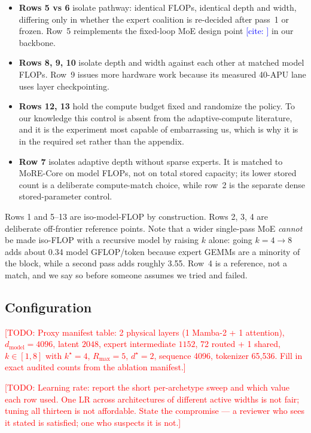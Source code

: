 \documentclass[11pt]{article}
\newcommand{\TODO}[1]{\textcolor{red}{[TODO: #1]}}
\newcommand{\CITE}[1]{\textcolor{blue}{[cite: \detokenize{#1}]}}
\newcommand{\Rmax}{R_{\max}}
\begin{document}
\begin{itemize}
\item \textbf{Rows 5 vs 6} isolate pathway: identical FLOPs, identical depth and
width, differing only in whether the expert coalition is re-decided after pass~1
or frozen. Row~5 reimplements the fixed-loop MoE design point
\CITE{loopmoe2026} in our backbone.
\item \textbf{Rows 8, 9, 10} isolate depth and width against each other at
matched model FLOPs. Row~9 issues more hardware work because its measured
40-APU lane uses layer checkpointing.
\item \textbf{Rows 12, 13} hold the compute budget fixed and randomize the
policy. To our knowledge this control is absent from the adaptive-compute
literature, and it is the experiment most capable of embarrassing us, which is
why it is in the required set rather than the appendix.
\item \textbf{Row 7} isolates adaptive depth without sparse experts. It is
matched to MoRE-Core on model FLOPs, not on total stored capacity; its lower
stored count is a deliberate compute-match choice, while row~2 is the separate
dense stored-parameter control.
\end{itemize}

Rows 1 and 5--13 are iso-model-FLOP by construction. Rows 2, 3, 4 are deliberate
off-frontier reference points. Note that a wider single-pass MoE \emph{cannot} be
made iso-FLOP with a recursive model by raising $k$ alone: going $k{=}4 \to 8$
adds about 0.34 model GFLOP/token because expert GEMMs are a minority of the
block, while a second pass adds roughly 3.55. Row~4 is a reference, not a match, and we say so before
someone assumes we tried and failed.

\subsection{Configuration}

\TODO{Proxy manifest table: 2 physical layers (1 Mamba-2 + 1 attention),
$d_{\mathrm{model}}=4096$, latent $2048$, expert intermediate $1152$, 72 routed + 1
shared, $k \in [1,8]$ with $k^\star=4$, $\Rmax=5$, $d^\star=2$, sequence 4096,
tokenizer 65{,}536. Fill in exact audited counts from the ablation manifest.}

\TODO{Learning rate: report the short per-archetype sweep and which value each
row used. One LR across architectures of different active widths is not fair;
tuning all thirteen is not affordable. State the compromise --- a reviewer who
sees it stated is satisfied; one who suspects it is not.}
\end{document}
